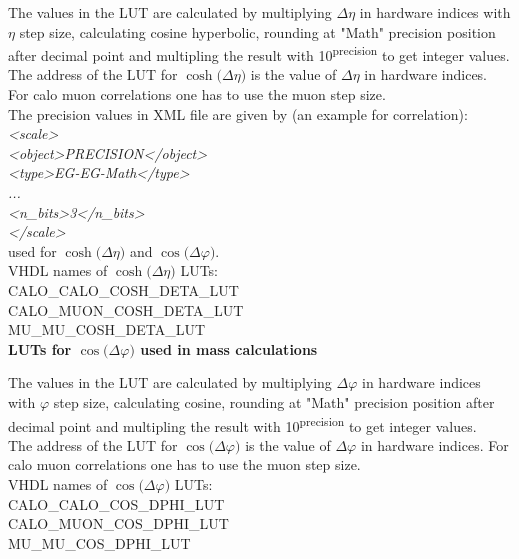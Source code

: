 The values in the LUT are calculated by multiplying $\Delta\eta$ in hardware indices with $\eta$ step size, calculating cosine hyperbolic, rounding at "Math" precision position after decimal point and multipling the result with 10\textsuperscript{\tiny{precision}} to get integer values.\\
The address of the LUT for $\cosh($$\Delta\eta$$)$ is the value of $\Delta\eta$ in hardware indices.\\
For calo muon correlations one has to use the muon step size.\\

The precision values in XML file are given by (an example for \eg \eg correlation):\\
\textit{<scale>\\
    <object>PRECISION</object>\\
    <type>EG-EG-Math</type>\\
    ...\\
    <n\_bits>3</n\_bits>\\
</scale>}\\
used for $\cosh($$\Delta\eta$$)$ and $\cos($$\Delta\varphi$$)$.\\

VHDL names of $\cosh($$\Delta\eta$$)$ LUTs:\\
CALO\_CALO\_COSH\_DETA\_LUT\\
CALO\_MUON\_COSH\_DETA\_LUT\\
MU\_MU\_COSH\_DETA\_LUT\\

\textbf{LUTs for $\cos($$\Delta\varphi$$)$ used in mass calculations}
\label{sec:gtl:calc_luts_cos_delta_phi}

The values in the LUT are calculated by multiplying $\Delta\varphi$ in hardware indices with $\varphi$ step size, calculating cosine, rounding at "Math" precision position after decimal point and multipling the result with 10\textsuperscript{\tiny{precision}} to get integer values.\\
The address of the LUT for $\cos($$\Delta\varphi$$)$ is the value of $\Delta\varphi$ in hardware indices.
For calo muon correlations one has to use the muon step size.\\

VHDL names of $\cos($$\Delta\varphi$$)$ LUTs:\\
CALO\_CALO\_COS\_DPHI\_LUT\\
CALO\_MUON\_COS\_DPHI\_LUT\\
MU\_MU\_COS\_DPHI\_LUT\\

